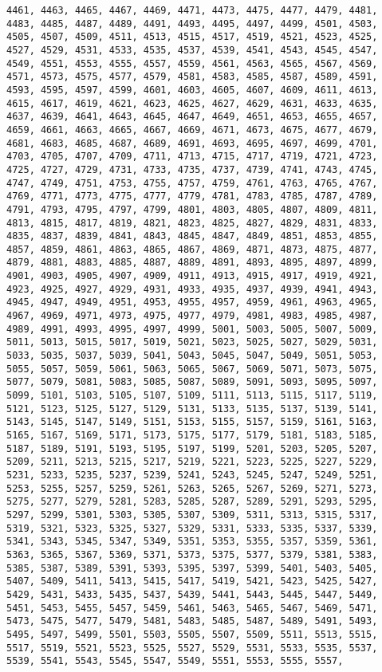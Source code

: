 \documentclass[11pt]{article}
\begin{document}
\begin{Verbatim}[commandchars=\\\{\}]
4461, 4463, 4465, 4467, 4469, 4471, 4473, 4475, 4477, 4479, 4481, 4483, 4485, 4487, 4489, 4491, 4493, 4495, 4497, 4499, 4501, 4503, 4505, 4507, 4509, 4511, 4513, 4515, 4517, 4519, 4521, 4523, 4525, 4527, 4529, 4531, 4533, 4535, 4537, 4539, 4541, 4543, 4545, 4547, 4549, 4551, 4553, 4555, 4557, 4559, 4561, 4563, 4565, 4567, 4569, 4571, 4573, 4575, 4577, 4579, 4581, 4583, 4585, 4587, 4589, 4591, 4593, 4595, 4597, 4599, 4601, 4603, 4605, 4607, 4609, 4611, 4613, 4615, 4617, 4619, 4621, 4623, 4625, 4627, 4629, 4631, 4633, 4635, 4637, 4639, 4641, 4643, 4645, 4647, 4649, 4651, 4653, 4655, 4657, 4659, 4661, 4663, 4665, 4667, 4669, 4671, 4673, 4675, 4677, 4679, 4681, 4683, 4685, 4687, 4689, 4691, 4693, 4695, 4697, 4699, 4701, 4703, 4705, 4707, 4709, 4711, 4713, 4715, 4717, 4719, 4721, 4723, 4725, 4727, 4729, 4731, 4733, 4735, 4737, 4739, 4741, 4743, 4745, 4747, 4749, 4751, 4753, 4755, 4757, 4759, 4761, 4763, 4765, 4767, 4769, 4771, 4773, 4775, 4777, 4779, 4781, 4783, 4785, 4787, 4789, 4791, 4793, 4795, 4797, 4799, 4801, 4803, 4805, 4807, 4809, 4811, 4813, 4815, 4817, 4819, 4821, 4823, 4825, 4827, 4829, 4831, 4833, 4835, 4837, 4839, 4841, 4843, 4845, 4847, 4849, 4851, 4853, 4855, 4857, 4859, 4861, 4863, 4865, 4867, 4869, 4871, 4873, 4875, 4877, 4879, 4881, 4883, 4885, 4887, 4889, 4891, 4893, 4895, 4897, 4899, 4901, 4903, 4905, 4907, 4909, 4911, 4913, 4915, 4917, 4919, 4921, 4923, 4925, 4927, 4929, 4931, 4933, 4935, 4937, 4939, 4941, 4943, 4945, 4947, 4949, 4951, 4953, 4955, 4957, 4959, 4961, 4963, 4965, 4967, 4969, 4971, 4973, 4975, 4977, 4979, 4981, 4983, 4985, 4987, 4989, 4991, 4993, 4995, 4997, 4999, 5001, 5003, 5005, 5007, 5009, 5011, 5013, 5015, 5017, 5019, 5021, 5023, 5025, 5027, 5029, 5031, 5033, 5035, 5037, 5039, 5041, 5043, 5045, 5047, 5049, 5051, 5053, 5055, 5057, 5059, 5061, 5063, 5065, 5067, 5069, 5071, 5073, 5075, 5077, 5079, 5081, 5083, 5085, 5087, 5089, 5091, 5093, 5095, 5097, 5099, 5101, 5103, 5105, 5107, 5109, 5111, 5113, 5115, 5117, 5119, 5121, 5123, 5125, 5127, 5129, 5131, 5133, 5135, 5137, 5139, 5141, 5143, 5145, 5147, 5149, 5151, 5153, 5155, 5157, 5159, 5161, 5163, 5165, 5167, 5169, 5171, 5173, 5175, 5177, 5179, 5181, 5183, 5185, 5187, 5189, 5191, 5193, 5195, 5197, 5199, 5201, 5203, 5205, 5207, 5209, 5211, 5213, 5215, 5217, 5219, 5221, 5223, 5225, 5227, 5229, 5231, 5233, 5235, 5237, 5239, 5241, 5243, 5245, 5247, 5249, 5251, 5253, 5255, 5257, 5259, 5261, 5263, 5265, 5267, 5269, 5271, 5273, 5275, 5277, 5279, 5281, 5283, 5285, 5287, 5289, 5291, 5293, 5295, 5297, 5299, 5301, 5303, 5305, 5307, 5309, 5311, 5313, 5315, 5317, 5319, 5321, 5323, 5325, 5327, 5329, 5331, 5333, 5335, 5337, 5339, 5341, 5343, 5345, 5347, 5349, 5351, 5353, 5355, 5357, 5359, 5361, 5363, 5365, 5367, 5369, 5371, 5373, 5375, 5377, 5379, 5381, 5383, 5385, 5387, 5389, 5391, 5393, 5395, 5397, 5399, 5401, 5403, 5405, 5407, 5409, 5411, 5413, 5415, 5417, 5419, 5421, 5423, 5425, 5427, 5429, 5431, 5433, 5435, 5437, 5439, 5441, 5443, 5445, 5447, 5449, 5451, 5453, 5455, 5457, 5459, 5461, 5463, 5465, 5467, 5469, 5471, 5473, 5475, 5477, 5479, 5481, 5483, 5485, 5487, 5489, 5491, 5493, 5495, 5497, 5499, 5501, 5503, 5505, 5507, 5509, 5511, 5513, 5515, 5517, 5519, 5521, 5523, 5525, 5527, 5529, 5531, 5533, 5535, 5537, 5539, 5541, 5543, 5545, 5547, 5549, 5551, 5553, 5555, 5557, 
\end{Verbatim}
\end{document}
